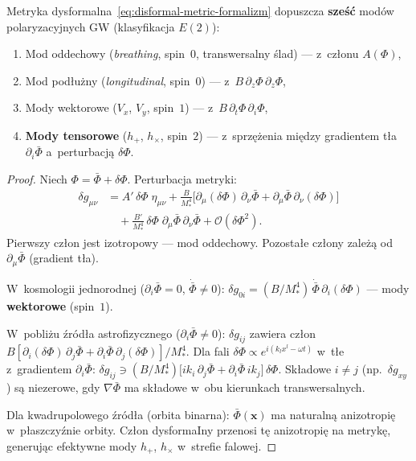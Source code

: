 \begin{proposition}%
\label{prop:disformal-polarization}
Metryka dysformalna~\eqref{eq:disformal-metric-formalizm}
dopuszcza \textbf{sze\'s\'c} mod\'ow polaryzacyjnych GW
(klasyfikacja $E(2)$):
\begin{enumerate}[nosep]
  \item Mod oddechowy (\emph{breathing}, spin~$0$,
    transwersalny \'slad) --- z~cz\l{}onu $A(\Phi)$,
  \item Mod pod\l{}u\.zny (\emph{longitudinal}, spin~$0$)
    --- z~$B\,\partial_z\Phi\,\partial_z\Phi$,
  \item Mody wektorowe ($V_x$, $V_y$, spin~$1$)
    --- z~$B\,\partial_t\Phi\,\partial_i\Phi$,
  \item \textbf{Mody tensorowe} ($h_+$, $h_\times$, spin~$2$)
    --- z~sprz\k{e}\.zenia mi\k{e}dzy gradientem t\l{}a
    $\partial_i\bar\Phi$ a~perturbacj\k{a} $\delta\Phi$.
\end{enumerate}
\end{proposition}

\begin{proof}
Niech $\Phi = \bar\Phi + \delta\Phi$. Perturbacja metryki:
\begin{align}
  \delta g_{\mu\nu}
  &= A'\,\delta\Phi\;\eta_{\mu\nu}
    + \frac{B}{M_*^4}\bigl[
      \partial_\mu(\delta\Phi)\,\partial_\nu\bar\Phi
    + \partial_\mu\bar\Phi\,\partial_\nu(\delta\Phi)
    \bigr] \nonumber\\
  &\quad + \frac{B'}{M_*^4}\,\delta\Phi\;
    \partial_\mu\bar\Phi\,\partial_\nu\bar\Phi
    + \mathcal{O}(\delta\Phi^2). \label{eq:disformal-perturbation}
\end{align}
Pierwszy cz\l{}on jest izotropowy --- mod oddechowy.
Pozosta\l{}e cz\l{}ony zale\.z\k{a} od
$\partial_\mu\bar\Phi$ (gradient t\l{}a).

W~kosmologii jednorodnej ($\partial_i\bar\Phi = 0$,
$\dot{\bar\Phi} \neq 0$):
$\delta g_{0i} = (B/M_*^4)\,\dot{\bar\Phi}\,\partial_i(\delta\Phi)$
--- mody \textbf{wektorowe} (spin~$1$).

W~pobli\.zu \'zr\'od\l{}a astrofizycznego
($\partial_i\bar\Phi \neq 0$):
$\delta g_{ij}$ zawiera cz\l{}on
$B[\partial_i(\delta\Phi)\,\partial_j\bar\Phi
+ \partial_i\bar\Phi\,\partial_j(\delta\Phi)]/M_*^4$.
Dla fali $\delta\Phi \propto e^{i(k_l x^l - \omega t)}$
w~t\l{}e z~gradientem $\partial_i\bar\Phi$:
$\delta g_{ij} \ni (B/M_*^4)\bigl[
  i k_i\,\partial_j\bar\Phi
+ \partial_i\bar\Phi\,i k_j
\bigr]\,\delta\Phi$.
Sk\l{}adowe $i \neq j$ (np.\ $\delta g_{xy}$) s\k{a}
niezerowe, gdy $\nabla\bar\Phi$ ma sk\l{}adowe
w~obu kierunkach transwersalnych.

Dla kwadrupolowego \'zr\'od\l{}a (orbita binarna):
$\bar\Phi(\mathbf{x})$ ma naturaln\k{a} anizotropi\k{e}
w~p\l{}aszczy\'znie orbity. Cz\l{}on dysformaIny
przenosi t\k{e} anizotropi\k{e} na metryk\k{e},
generuj\k{a}c efektywne mody $h_+$, $h_\times$
w~strefie falowej.
\end{proof}


